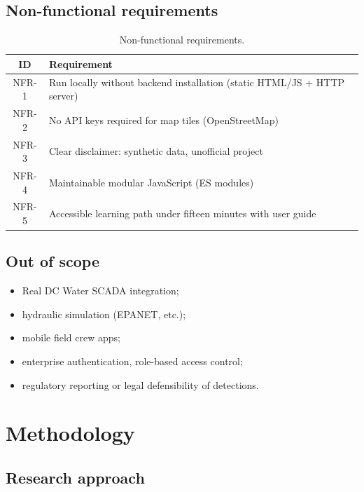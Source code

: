 \documentclass[12pt,a4paper]{article}
\begin{document}
\subsection{Non-functional requirements}

\begin{table}[htbp]
\centering
\caption{Non-functional requirements.}
\label{tab:nfr}
\begin{tabular}{@{}cl@{}}
\toprule
\textbf{ID} & \textbf{Requirement} \\
\midrule
NFR-1 & Run locally without backend installation (static HTML/JS + HTTP server) \\
NFR-2 & No API keys required for map tiles (OpenStreetMap) \\
NFR-3 & Clear disclaimer: synthetic data, unofficial project \\
NFR-4 & Maintainable modular JavaScript (ES modules) \\
NFR-5 & Accessible learning path under fifteen minutes with user guide \\
\bottomrule
\end{tabular}
\end{table}

\subsection{Out of scope}

\begin{itemize}
    \item Real DC Water SCADA integration;
    \item hydraulic simulation (EPANET, etc.);
    \item mobile field crew apps;
    \item enterprise authentication, role-based access control;
    \item regulatory reporting or legal defensibility of detections.
\end{itemize}

\section{Methodology}
\label{sec:methodology}

\subsection{Research approach}
\end{document}
